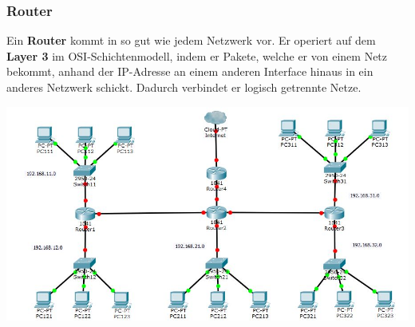\documentclass[12pt,a4paper]{report}
\begin{document}
\subsubsection{Router}
Ein \textbf{Router} kommt in so gut wie jedem Netzwerk vor. Er operiert auf dem \textbf{Layer 3} im OSI-Schichtenmodell, indem er Pakete, welche er von einem Netz bekommt, anhand der IP-Adresse an einem anderen Interface hinaus in ein anderes Netzwerk schickt. Dadurch verbindet er logisch getrennte Netze.\\

\begin{center}
\includegraphics[scale=0.5]{../docs/tarkes/pics/RouterNetwork.jpg}\label{fig:bspNetwork}
\end{center}
\end{document}
